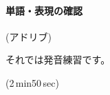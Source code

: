 \documentclass[book,jafontscale=0.9247]{jlreq}
\newenvironment{my_check}
  {\begin{itemize}
    \renewcommand\labelitemi{$\square\hspace{0.5em}$}} %
  {\end{itemize}}
\begin{document}
\paragraph{単語・表現の確認}
(アドリブ)

それでは発音練習です。

\faVolumeUp{}(2\,min50\,sec)
\newpage

%
%
%
%
%
%
%
%
%
%
%
%
%
%
%
%
%
%
%
%
%
%
%
%
%
%
%
%
%
%
\end{document}
